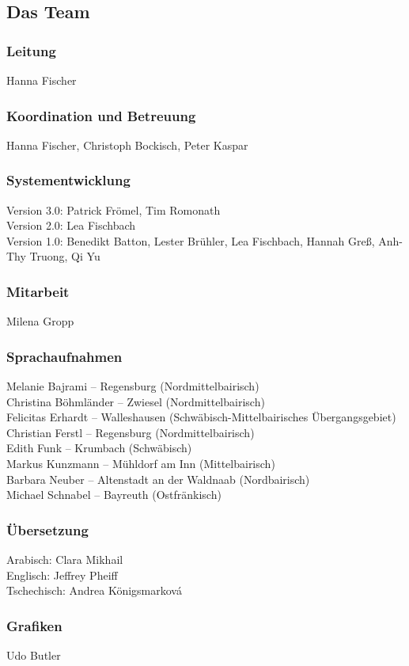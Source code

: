 \subsection{Das Team}
\subsubsection*{Leitung}
Hanna Fischer
\subsubsection*{Koordination und Betreuung}
Hanna Fischer, Christoph Bockisch, Peter Kaspar 
\subsubsection*{Systementwicklung}
Version 3.0: Patrick Frömel, Tim Romonath\\
Version 2.0: Lea Fischbach\\
Version 1.0: Benedikt Batton, Lester Brühler, Lea Fischbach, Hannah Greß, Anh-Thy Truong, Qi Yu 
\subsubsection*{Mitarbeit}
Milena Gropp
\subsubsection*{Sprachaufnahmen}
Melanie Bajrami – Regensburg (Nordmittelbairisch)\\
Christina Böhmländer – Zwiesel (Nordmittelbairisch)\\
Felicitas Erhardt – Walleshausen (Schwäbisch-Mittelbairisches Übergangsgebiet)\\
Christian Ferstl – Regensburg (Nordmittelbairisch)\\
Edith Funk – Krumbach (Schwäbisch)\\
Markus Kunzmann – Mühldorf am Inn (Mittelbairisch)\\
Barbara Neuber – Altenstadt an der Waldnaab (Nordbairisch)\\
Michael Schnabel – Bayreuth (Ostfränkisch)\\
\subsubsection*{Übersetzung}
Arabisch: Clara Mikhail\\
Englisch: Jeffrey Pheiff\\
Tschechisch: Andrea Königsmarková
\subsubsection*{Grafiken}
Udo Butler
